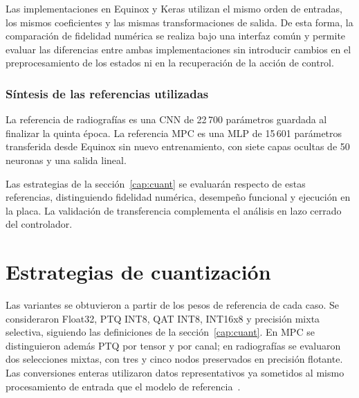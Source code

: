 Las implementaciones en Equinox y Keras utilizan el mismo orden
de entradas, los mismos coeficientes y las mismas transformaciones
de salida. De esta forma, la comparación de fidelidad numérica
se realiza bajo una interfaz común y permite evaluar las
diferencias entre ambas implementaciones sin introducir cambios
en el preprocesamiento de los estados ni en la recuperación
de la acción de control.


\subsubsection{Síntesis de las referencias utilizadas}
La referencia de radiografías es una CNN de 22\,700 parámetros guardada al finalizar la quinta época. La referencia MPC es una MLP de 15\,601 parámetros transferida desde Equinox sin nuevo entrenamiento, con siete capas ocultas de 50 neuronas y una salida lineal.

Las estrategias de la sección~\ref{cap:cuant} se evaluarán respecto de estas referencias, distinguiendo fidelidad numérica, desempeño funcional y ejecución en la placa. La validación de transferencia complementa el análisis en lazo cerrado del controlador.

\section{Estrategias de cuantización}
\label{sec:estrategias_experimentales}

Las variantes se obtuvieron a partir de los pesos de referencia de cada caso. Se consideraron Float32, PTQ INT8, QAT INT8, INT16x8 y precisión mixta selectiva, siguiendo las definiciones de la sección~\ref{cap:cuant}. En MPC se distinguieron además PTQ por tensor y por canal; en radiografías se evaluaron dos selecciones mixtas, con tres y cinco nodos preservados en precisión flotante. Las conversiones enteras utilizaron datos representativos ya sometidos al mismo procesamiento de entrada que el modelo de referencia~\cite{cap5_ptq}.

